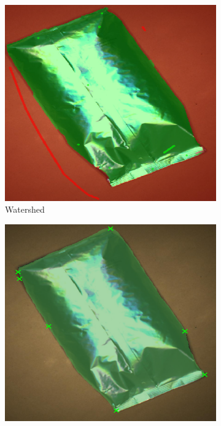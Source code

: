 


\begin{figure}
	\centering
	\begin{subfigure}[t]{0.3\textwidth}
		\centering
		\includegraphics[width=\textwidth]{figures/appendix/method_predictions/bag21_watershed.png}
		\caption{Watershed}
	\end{subfigure}
	\hfill
	\begin{subfigure}[t]{0.3\textwidth}
		\centering
		\includegraphics[width=\textwidth]{figures/appendix/method_predictions/bag21_dextr.png}

\end{subfigure}
\end{figure}
